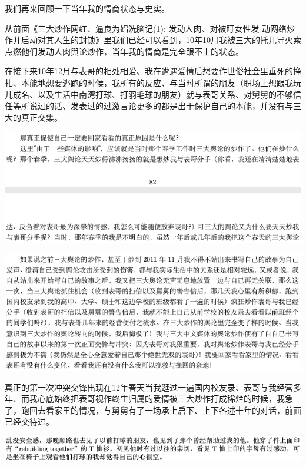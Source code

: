 \documentclass[9pt, b5paper]{article}
\begin{document}
我们再来回顾一下当年我的情商状态与史实。 

从前面《三大炒作网红、逼良为娼洗脑记(1): 发动人肉、对被盯女性发 动网络炒作并启动对其人生的封锁》里我们已经可以看到，10年10月我被三大的托儿导火索点燃他们发动人肉舆论炒作，当年我的情商是完全跟不上的状态。 

在接下来10年12月与表哥的相处相爱、我在遭遇爱情后想要作世俗社会里垂死的挣扎、本能地想要逃跑的时候，我所有的反应、与当时所谓的朋友（职场上想跟我玩儿成名、以及生活中南湾打球、打羽毛球的朋友）就与表哥关系、对舅舅的不够信任等所说过的话、发表过的过激言论更多的都是出于保护自己的本能，并没有与三大的真正交集。

\begin{center}
\includegraphics[width=.9\linewidth]{./pic/backups_plans_20210412_173011.png}
\end{center}

\begin{center}
\includegraphics[width=.9\linewidth]{./pic/backups_plans_20210412_173106.png}
\end{center}

真正的第一次冲突交锋出现在12年春天当我逛过一遍国内校友录、表哥与我经营多年、而我心底始终把表哥视作终生归属的爱情被三大炒作打成稀烂的时候，我急了，跑回去看家里的情况，与舅舅有了一场承上启下、上下各述十年的对话，前面已经交待过。

\begin{center}
\includegraphics[width=.9\linewidth]{./pic/backups_plans_20210412_173313.png}
\end{center}
\end{document}
